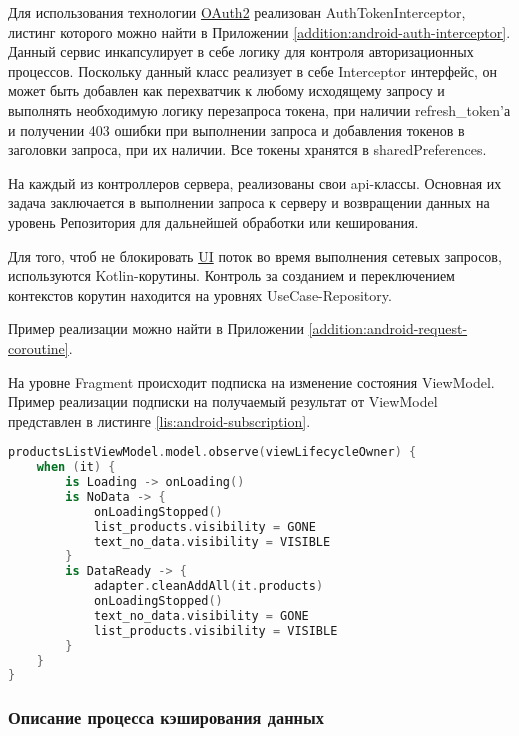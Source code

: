 Для использования технологии \hyperlink{gloss:oauth}{OAuth2} реализован AuthTokenInterceptor, листинг которого можно найти в Приложении \ref{addition:android-auth-interceptor}.
Данный сервис инкапсулирует в себе логику для контроля авторизационных процессов.
Поскольку данный класс реализует в себе Interceptor интерфейс, он может быть добавлен как перехватчик к любому исходящему запросу и выполнять необходимую логику перезапроса токена, при наличии refresh\_token’а и получении 403 ошибки при выполнении запроса и добавления токенов в заголовки запроса, при их наличии.
Все токены хранятся в sharedPreferences.

На каждый из контроллеров сервера, реализованы свои api-классы.
Основная их задача заключается в выполнении запроса к серверу и возвращении данных на уровень Репозитория для дальнейшей обработки или кеширования.

Для того, чтоб не блокировать \hyperlink{gloss:ui}{UI} поток во время выполнения сетевых запросов, используются Kotlin-корутины.
Контроль за созданием и переключением контекстов корутин находится на уровнях UseCase-Repository.

Пример реализации можно найти в Приложении \ref{addition:android-request-coroutine}.

На уровне Fragment происходит подписка на изменение состояния ViewModel.
Пример реализации подписки на получаемый результат от ViewModel представлен в листинге \ref{lis:android-subscription}.

\begin{minipage}{\textwidth}
\begin{lstlisting}[language=Kotlin, captionpos=b,
    label={lis:android-subscription},
    caption={Пример реализации подписки на ViewModel}
]
productsListViewModel.model.observe(viewLifecycleOwner) {
    when (it) {
        is Loading -> onLoading()
        is NoData -> {
            onLoadingStopped()
            list_products.visibility = GONE
            text_no_data.visibility = VISIBLE
        }
        is DataReady -> {
            adapter.cleanAddAll(it.products)
            onLoadingStopped()
            text_no_data.visibility = GONE
            list_products.visibility = VISIBLE
        }
    }
}
    \end{lstlisting}
\end{minipage}

\subsubsection{Описание процесса кэширования данных}\indent

